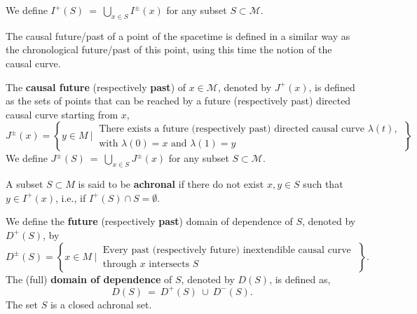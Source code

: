 \documentclass[10pt]{book}
\newcommand{\Mcal}{\mathcal{M}}
\theoremstyle{break}
\newtheorem{definition}{Definition}
\begin{document}
We define $I^{+}(S) \ = \ \bigcup_{x \in S} I^{\pm}(x)$ for any subset $S \subset \Mcal$.
%

\bigskip

The causal future/past of a point of the spacetime is defined in a similar way as the chronological future/past of this point, using this time the notion of the causal curve.

\bigskip

%
The \textbf{causal future} (respectively \textbf{past}) of $x \in \Mcal$, denoted by $J^{+}(x)$, is defined as the sets of points that can be reached by a future (respectively past) directed causal curve starting from $x$,
%
\begin{equation*}
J^{\pm}(x) = \left\{ y \in M \ \bigg| \ \begin{array}{l} \text{There exists a future (respectively past) directed causal curve $\lambda(t)$,} \\ \text{with $\lambda(0)=x$ and $\lambda(1)=y$} \end{array} \; \right\},
\end{equation*}
We define $J^{\pm}(S) \ = \ \bigcup_{x \in S} J^{\pm}(x)$ for any subset $S \subset \Mcal$.
%


\bigskip


A subset $S \subset M$ is said to be \textbf{achronal} if there do not exist $x, y \in S$ such that $y \in I^{+}(x)$, i.e., if $I^{+}(S) \cap S = \emptyset$. 


\bigskip


We define the \textbf{future} (respectively \textbf{past}) domain of dependence of $S$, denoted by $D^{+}(S)$, by
%
\begin{equation*}
D^{\pm}(S) = \left\{ x \in M \ \bigg| \ \begin{array}{l} \text{Every past (respectively future) inextendible causal curve} \\ \text{through $x$ intersects $S$} \end{array} \; \right\}.
\end{equation*}
%
The (full) \textbf{domain of dependence} of $S$, denoted by $D(S)$, is defined as,
\begin{equation*}
D(S) \ = \ D^{+}(S) \ \cup \ D^{-}(S).
\end{equation*}
The set $S$ is a closed achronal set.
\end{document}
